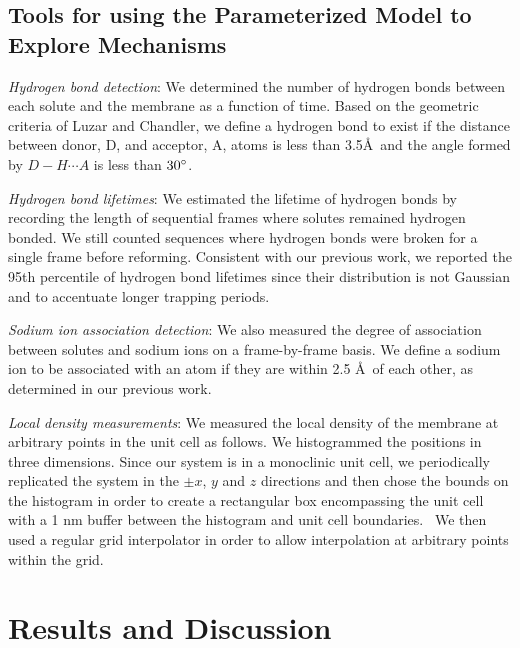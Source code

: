 \documentclass[journal=jpcbfk,manuscript=article]{achemso}
\begin{document}
  \subsection{Tools for using the Parameterized Model to Explore Mechanisms}\label{method:interactions}
  
  \textit{Hydrogen bond detection}: We determined the number of hydrogen bonds 
  between each solute and the membrane as a function of time. Based on the 
  geometric criteria of Luzar and Chandler, we define a hydrogen bond to exist 
  if the distance between donor, D, and acceptor, A, atoms is less than 
  3.5\AA~and the angle formed by $D-H \cdots A$ is less than $30\degree$.~\cite{luzar_effect_1996}
  
  \textit{Hydrogen bond lifetimes}: We estimated the lifetime of hydrogen bonds by 
  recording the length of sequential frames where solutes remained hydrogen bonded.
  We still counted sequences where hydrogen bonds were broken for a single frame 
  before reforming. Consistent with our previous work, we reported the 95th 
  percentile of hydrogen bond lifetimes since their distribution is not Gaussian
  and to 
  accentuate
  longer trapping periods.~\cite{coscia_chemically_2019}
  
  \textit{Sodium ion association detection}: We also measured the degree of association
  between solutes and sodium ions on a frame-by-frame basis. We define a sodium ion to
  be associated with an atom if they are within 2.5 \AA~of each other, as determined 
  in our previous work.~\cite{coscia_chemically_2019}
  
  \textit{Local density measurements}: We measured the local density of the membrane at
  arbitrary points in the unit cell as follows. We histogrammed the positions in three 
  dimensions. Since our system is in a monoclinic unit cell, we periodically replicated
  the system in the $\pm x$, $y$ and $z$ directions and then chose the bounds on the
  histogram in order to create a rectangular box encompassing the unit cell with
  a 1 nm buffer between the histogram and unit cell boundaries.~\cite{van_der_walt_numpy_2011}
  We then used a regular grid interpolator in order to allow interpolation at arbitrary
  points within the grid.~\cite{virtanen_scipy_2020} 

  \section{Results and Discussion}
  
\end{document}
